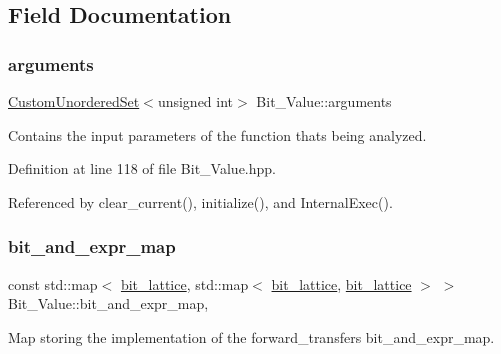 \subsection{Field Documentation}
\mbox{\label{classBit__Value_afb50fdc59b857254fab26a29218c65b7}} 
\subsubsection{\texorpdfstring{arguments}{arguments}}
{\footnotesize\ttfamily \hyperlink{classCustomUnorderedSet}{Custom\+Unordered\+Set}$<$unsigned int$>$ Bit\+\_\+\+Value\+::arguments\hspace{0.3cm}{\ttfamily [private]}}



Contains the input parameters of the function that\textquotesingle{}s being analyzed. 



Definition at line 118 of file Bit\+\_\+\+Value.\+hpp.



Referenced by clear\+\_\+current(), initialize(), and Internal\+Exec().

\mbox{\label{classBit__Value_a269f2f5c0db02d71e3f940c98b5b36e6}} 
\subsubsection{\texorpdfstring{bit\+\_\+and\+\_\+expr\+\_\+map}{bit\_and\_expr\_map}}
{\footnotesize\ttfamily const std\+::map$<$ \hyperlink{bit__lattice_8hpp_ab732360111c810c4eaeb4c8b81d160d6}{bit\+\_\+lattice}, std\+::map$<$ \hyperlink{bit__lattice_8hpp_ab732360111c810c4eaeb4c8b81d160d6}{bit\+\_\+lattice}, \hyperlink{bit__lattice_8hpp_ab732360111c810c4eaeb4c8b81d160d6}{bit\+\_\+lattice} $>$ $>$ Bit\+\_\+\+Value\+::bit\+\_\+and\+\_\+expr\+\_\+map\hspace{0.3cm}{\ttfamily [static]}, {\ttfamily [private]}}



Map storing the implementation of the forward\+\_\+transfer\textquotesingle{}s bit\+\_\+and\+\_\+expr\+\_\+map. 



